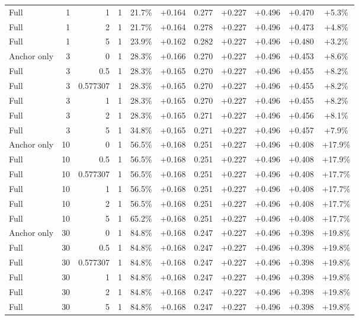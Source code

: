 \begin{table}[htbp]
\begin{tabular}{lrrrccccccc}
Full & 1 & 1 & 1 & 21.7\% & +0.164 & 0.277 & +0.227 & +0.496 & +0.470 & +5.3\% \\
Full & 1 & 2 & 1 & 21.7\% & +0.164 & 0.278 & +0.227 & +0.496 & +0.473 & +4.8\% \\
Full & 1 & 5 & 1 & 23.9\% & +0.162 & 0.282 & +0.227 & +0.496 & +0.480 & +3.2\% \\
Anchor only & 3 & 0 & 1 & 28.3\% & +0.166 & 0.270 & +0.227 & +0.496 & +0.453 & +8.6\% \\
Full & 3 & 0.5 & 1 & 28.3\% & +0.165 & 0.270 & +0.227 & +0.496 & +0.455 & +8.2\% \\
Full & 3 & 0.577307 & 1 & 28.3\% & +0.165 & 0.270 & +0.227 & +0.496 & +0.455 & +8.2\% \\
Full & 3 & 1 & 1 & 28.3\% & +0.165 & 0.270 & +0.227 & +0.496 & +0.455 & +8.2\% \\
Full & 3 & 2 & 1 & 28.3\% & +0.165 & 0.271 & +0.227 & +0.496 & +0.456 & +8.1\% \\
Full & 3 & 5 & 1 & 34.8\% & +0.165 & 0.271 & +0.227 & +0.496 & +0.457 & +7.9\% \\
Anchor only & 10 & 0 & 1 & 56.5\% & +0.168 & 0.251 & +0.227 & +0.496 & +0.408 & +17.9\% \\
Full & 10 & 0.5 & 1 & 56.5\% & +0.168 & 0.251 & +0.227 & +0.496 & +0.408 & +17.9\% \\
Full & 10 & 0.577307 & 1 & 56.5\% & +0.168 & 0.251 & +0.227 & +0.496 & +0.408 & +17.7\% \\
Full & 10 & 1 & 1 & 56.5\% & +0.168 & 0.251 & +0.227 & +0.496 & +0.408 & +17.7\% \\
Full & 10 & 2 & 1 & 56.5\% & +0.168 & 0.251 & +0.227 & +0.496 & +0.408 & +17.7\% \\
Full & 10 & 5 & 1 & 65.2\% & +0.168 & 0.251 & +0.227 & +0.496 & +0.408 & +17.7\% \\
Anchor only & 30 & 0 & 1 & 84.8\% & +0.168 & 0.247 & +0.227 & +0.496 & +0.398 & +19.8\% \\
Full & 30 & 0.5 & 1 & 84.8\% & +0.168 & 0.247 & +0.227 & +0.496 & +0.398 & +19.8\% \\
Full & 30 & 0.577307 & 1 & 84.8\% & +0.168 & 0.247 & +0.227 & +0.496 & +0.398 & +19.8\% \\
Full & 30 & 1 & 1 & 84.8\% & +0.168 & 0.247 & +0.227 & +0.496 & +0.398 & +19.8\% \\
Full & 30 & 2 & 1 & 84.8\% & +0.168 & 0.247 & +0.227 & +0.496 & +0.398 & +19.8\% \\
Full & 30 & 5 & 1 & 84.8\% & +0.168 & 0.247 & +0.227 & +0.496 & +0.398 & +19.8\% \\

\end{tabular}
\end{table}
